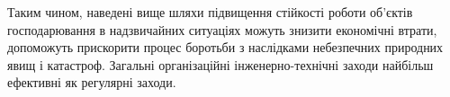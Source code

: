 Таким чином, наведені вище шляхи підвищення стійкості роботи об'єктів господарювання в надзвичайних ситуаціях можуть знизити економічні втрати, допоможуть прискорити процес боротьби з наслідками небезпечних природних явищ і катастроф.
Загальні організаційні інженерно-технічні заходи найбільш ефективні як регулярні заходи.
